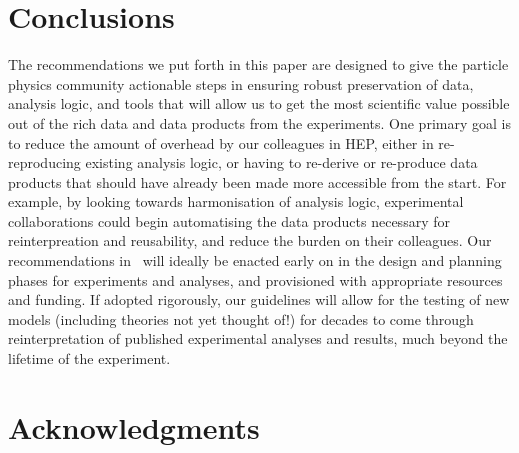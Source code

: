 \documentclass[11pt]{article}
\begin{document}
\section{Conclusions}

The recommendations we put forth in this paper are designed to give the particle physics community actionable steps in ensuring robust preservation of data, analysis logic, and tools that will allow us to get the most scientific value possible out of the rich data and data products from the experiments.
One primary goal is to reduce the amount of overhead by our colleagues in \gls{HEP}, either in re-reproducing existing analysis logic, or having to re-derive or re-produce data products that should have already been made more accessible from the start.
For example, by looking towards harmonisation of analysis logic, experimental collaborations could begin automatising the data products necessary for reinterpreation and reusability, and reduce the burden on their colleagues.
Our recommendations in~ will %
ideally be enacted early on in 
the design and planning phases for experiments and analyses, and provisioned with appropriate resources and funding. 
If adopted rigorously, our guidelines will allow for the testing of new models (including theories not yet thought of!) for decades to come through reinterpretation %
of published experimental analyses and results, much beyond the lifetime of the experiment.

\section*{Acknowledgments}
\end{document}
